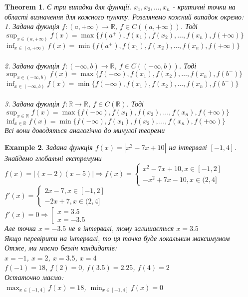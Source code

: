\documentclass[a4paper, 14pt]{extarticle}
\def\huge{\displaystyle}
\def\bigline{\vspace{5mm}\\}
\theoremstyle{theoremdd}
\newtheorem{theorem}{Theorem}[subsection]
\theoremstyle{theoremdd}
\theoremstyle{theoremdd}
\theoremstyle{theoremdd}
\newtheorem{example}[theorem]{Example}
\theoremstyle{theoremdd}
\theoremstyle{theoremdd}
\theoremstyle{theoremdd}
\theoremstyle{theoremdd}
\begin{document}
\begin{theorem}
Є три випадки для функції. $x_1,x_2,\dots,x_n$ - критичні точки на області визначення для кожного пункту. Розглянемо кожний випадок окремо:\\
1. Задана фукнція $f: (a,+\infty) \to \mathbb{R}$, $f \in C((a,+\infty))$. Тоді\\
$\huge \sup_{x \in (a,+\infty)} f(x) = \max\{f(a^+),f(x_1),f(x_2),\dots,f(x_n),f(+\infty)\}$\\
$\huge \inf_{x \in (a,+\infty)} f(x) = \min\{f(a^+),f(x_1),f(x_2),\dots,f(x_n),f(+\infty)\}$\\
\bigline
2. Задана фукнція $f: (-\infty,b) \to \mathbb{R}$, $f \in C((-\infty,b))$. Тоді\\
$\huge \sup_{x \in (-\infty,b)} f(x) = \max\{f(-\infty),f(x_1),f(x_2),\dots,f(x_n),f(b^-)\}$\\
$\huge \inf_{x \in (-\infty,b)} f(x) = \min\{f(-\infty),f(x_1),f(x_2),\dots,f(x_n),f(b^-)\}$\\
\bigline
3. Задана фукнція $f: \mathbb{R} \to \mathbb{R}$, $f \in C(\mathbb{R})$. Тоді\\
$\huge \sup_{x \in \mathbb{R}} f(x) = \max\{f(-\infty),f(x_1),f(x_2),\dots,f(x_n),f(+\infty)\}$\\
$\huge \inf_{x \in \mathbb{R}} f(x) = \min\{f(-\infty),f(x_1),f(x_2),\dots,f(x_n),f(+\infty)\}$\\
\textit{Всі вони доводяться аналогічно до минулої теореми}
\end{theorem}

\begin{example}
Задана функція $f(x) = |x^2-7x+10|$ на інтервалі $[-1,4]$. Знайдемо глобальні екстремуми\\
$f(x) = |(x-2)(x-5)| \Rightarrow f(x) = \begin{cases} x^2-7x+10, x \in [-1,2] \\ -x^2+7x-10, x \in (2,4] \end{cases}$\\
$f'(x) = \begin{cases} 2x-7, x \in [-1,2] \\ -2x+7, x \in (2,4] \end{cases}$\\
$f'(x) = 0 \Rightarrow \left[ \begin{gathered} x=3.5 \\ x=-3.5 \end{gathered} \right.$\\
Але точка $x=-3.5$ не в інтервалі, тому залишається $x=3.5$\\
Якщо перевірити на інтервалі, то ця точка буде локальним максимумом\\
Отже, ми маємо безліч кандидатів:\\
$x=-1$, $x=2$, $x=3.5$, $x=4$\\
$f(-1) = 18$, $f(2) = 0$, $f(3.5) = 2.25$, $f(4) = 2$\\
Остаточно маємо:\\
$\huge \max_{x \in [-1,4]} f(x) = 18$, $\huge \min_{x \in [-1,4]} f(x) = 0$
\end{example}
\end{document}
